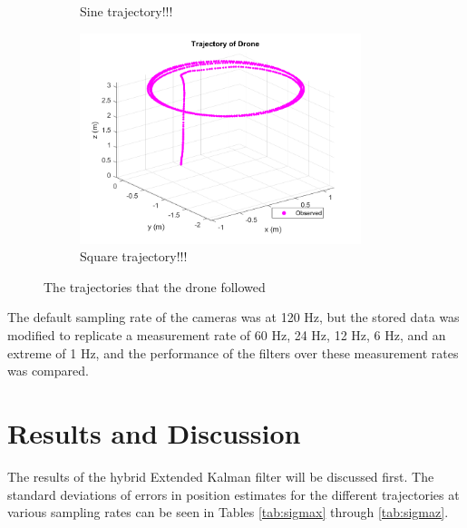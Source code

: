 \documentclass[letterpaper, preprint, paper,11pt]{AAS}	%
\begin{document}
\begin{figure}[H]
\begin{subfigure}{.3\textwidth}
	\caption{Sine trajectory!!!}
	\label{fig:sine1_just_traj}
\end{subfigure}%
\begin{subfigure}{.3\textwidth}
	\centering
	\includegraphics[width=0.9\textwidth]{../circle1_just_traj}
	\caption{Square trajectory!!!}
	\label{fig:square1_just_traj}
\end{subfigure}
\caption{The trajectories that the drone followed}
\label{fig:DroneTrajectories}
\end{figure}

The default sampling rate of the cameras was at 120 Hz, but the stored data was modified to replicate a measurement rate of 60 Hz, 24 Hz, 12 Hz, 6 Hz, and an extreme of 1 Hz, and the performance of the filters over these measurement rates was compared.

\section{Results and Discussion}

The results of the hybrid Extended Kalman filter will be discussed first. The standard deviations of errors in position estimates for the different trajectories at various sampling rates can be seen in Tables \ref{tab:sigmax} through \ref{tab:sigmaz}.

\end{document}
